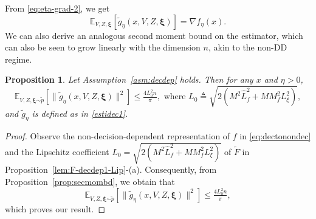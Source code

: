 \documentclass[11pt,reqno]{amsart}
\newcommand{\1}{{\bf 1}}
\newcommand{\2}{{\bf 2}}
\newcommand{\us}[1]{\textcolor{red}{#1}}
\newcommand{\bxi}{\boldsymbol{\xi}}
\newcommand{\E}{\mathbb E}
\newcommand{\lp}{\left(}
\newcommand{\rp}{\right)}
\numberwithin{equation}{section}
\newtheorem{proposition}{Proposition}[section]
\theoremstyle{remark}
\newcommand{\beq}{\begin{equation}}
\newcommand{\eeq}{\end{equation}}
\begin{document}
{					
					From \eqref{eq:eta-grad-2}, we get 
					\beq\label{eq:unbiased-dd-1}
					\E_{V,Z, \bxi} [\tilde{g}_{\eta}(x,V,Z, \bxi)] = \nabla f_{\eta}(x).
					\eeq
					We can also derive an analogous second moment bound on the estimator, {which can also be seen to grow linearly with the dimension $n$, akin to the non-DD regime}.
					\begin{proposition}\label{prop:2mombd-DD1}
						Let Assumption~\ref{asm:decdep} holds.  Then for any $x$ and $\eta > 0$,
						\begin{equation*}
							\mathbb{E}_{V,Z,\bxi {\sim \tilde{p}}}\left[\|\tilde{g}_\eta(x,V,Z,\bxi)\|^2\right]\leq {\tfrac{4L_0^2 n}{\pi}}, \mbox{ where } {L_0 \triangleq {\sqrt{2 \lp M^2\hat{L}_f^2 +M M_f^2L_\xi^2 \rp}}},
						\end{equation*}
						{ and } $\tilde g_{\eta}$ is defined as in \eqref{estidec1}.
					\end{proposition}
					\begin{proof}
					Observe the non-decision-dependent representation of $f$ in \eqref{eq:dectonondec} and the Lipschitz coefficient $L_0 = {\sqrt{2 \lp M^2\hat{L}_f^2 +M M_f^2L_\xi^2 \rp}}$ of $\tilde{F}$ in Proposition~\ref{lem:F-decdep1-Lip}-(a). Consequently, from Proposition~\ref{prop:secmombd}, we obtain that
					\begin{equation*}
						\mathbb{E}_{V,Z,\bxi {\sim \tilde{p}}}\left[\|\tilde{g}_\eta(x,V,Z,\bxi)\|^2\right]\leq \tfrac{4L_0^2 n}{\pi},
					\end{equation*}
					which proves our result.
					\end{proof}
					}
\end{document}

